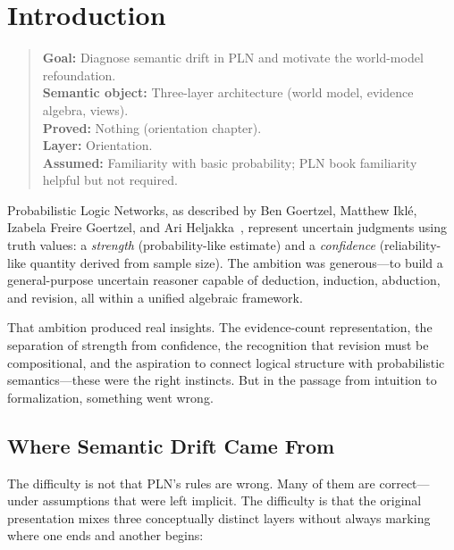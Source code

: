 \documentclass[11pt,openany]{report}
\begin{document}
\chapter{Introduction}
\label{ch:introduction}

\begin{quote}\small
\textbf{Goal:} Diagnose semantic drift in PLN and motivate the world-model refoundation.\\
\textbf{Semantic object:} Three-layer architecture (world model, evidence algebra, views).\\
\textbf{Proved:} Nothing (orientation chapter).\\
\textbf{Layer:} Orientation.\\
\textbf{Assumed:} Familiarity with basic probability; PLN book familiarity helpful but not required.
\end{quote}

Probabilistic Logic Networks, as described by Ben Goertzel, Matthew Ikl\'{e},
Izabela Freire Goertzel, and Ari Heljakka~\cite{goertzel2009pln}, represent uncertain judgments using truth
values: a \emph{strength} (probability-like estimate) and a \emph{confidence}
(reliability-like quantity derived from sample size).  The ambition was
generous---to build a general-purpose uncertain reasoner capable of deduction,
induction, abduction, and revision, all within a unified algebraic framework.

That ambition produced real insights.  The evidence-count representation, the
separation of strength from confidence, the recognition that revision must be
compositional, and the aspiration to connect logical structure with
probabilistic semantics---these were the right instincts.  But in the passage
from intuition to formalization, something went wrong.

\section{Where Semantic Drift Came From}

The difficulty is not that PLN's rules are wrong.  Many of them are
correct---under assumptions that were left implicit.  The difficulty is that
the original presentation mixes three conceptually distinct layers without
always marking where one ends and another begins:
\end{document}
